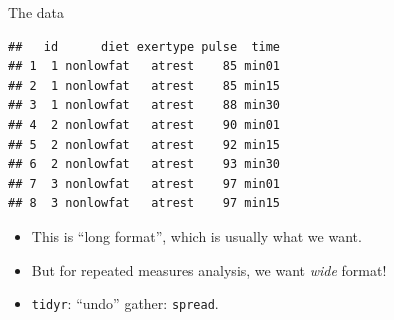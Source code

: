 \begin{frame}[fragile]{The data}
  
\begin{knitrout}
\color{fgcolor}\begin{kframe}
\begin{alltt}
\hlkwb{=}\hlstd{(}\hlstd{,}
\hlstd{)}
\end{alltt}
\begin{verbatim}
##   id      diet exertype pulse  time
## 1  1 nonlowfat   atrest    85 min01
## 2  1 nonlowfat   atrest    85 min15
## 3  1 nonlowfat   atrest    88 min30
## 4  2 nonlowfat   atrest    90 min01
## 5  2 nonlowfat   atrest    92 min15
## 6  2 nonlowfat   atrest    93 min30
## 7  3 nonlowfat   atrest    97 min01
## 8  3 nonlowfat   atrest    97 min15
\end{verbatim}
\end{kframe}
\end{knitrout}

\begin{itemize}
\item This is ``long format'', which is usually what we want.
\item But for repeated measures analysis, we want \emph{wide} format!
\item \texttt{tidyr}: ``undo'' gather: \texttt{spread}.
\end{itemize}
  
\end{frame}

